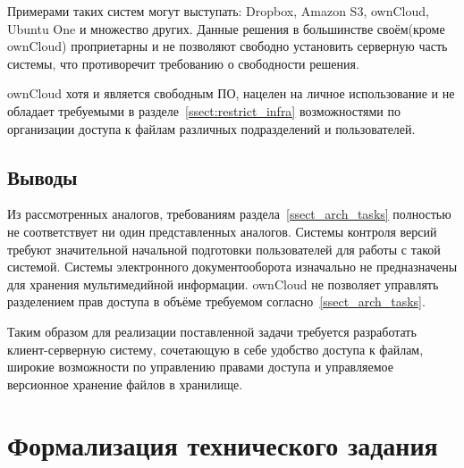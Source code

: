 \documentclass[utf8,usehyperref,12pt]{G7-32}
\begin{document}
Примерами таких систем могут выступать: Dropbox, Amazon S3, ownCloud, Ubuntu One и множество других. Данные решения в большинстве своём(кроме ownCloud) проприетарны и не позволяют свободно установить серверную часть системы, что противоречит требованию о свободности решения.

ownCloud хотя и является свободным ПО, нацелен на личное использование и не обладает требуемыми в разделе~\ref{ssect:restrict_infra} возможностями по организации доступа к файлам различных подразделений и пользователей.





\subsection{Выводы}

Из рассмотренных аналогов, требованиям раздела~\ref{ssect_arch_tasks} полностью не соответствует ни один представленных аналогов. Системы контроля версий требуют значительной начальной подготовки пользователей для работы с такой системой. Системы электронного документооборота изначально не предназначены для хранения мультимедийной информации. ownCloud не позволяет управлять разделением прав доступа в объёме требуемом согласно~\ref{ssect_arch_tasks}.

Таким образом для реализации поставленной задачи требуется разработать клиент-серверную систему, сочетающую в себе удобство доступа к файлам, широкие возможности по управлению правами доступа и управляемое версионное хранение файлов в хранилище.

\section{Формализация технического задания}\label{sect:formal_req}
\end{document}
